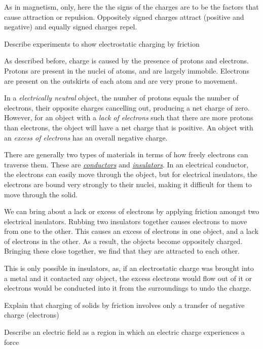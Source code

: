 As in magnetism, only, here the the signs of the charges are to be the factors that cause attraction or
repulsion. Oppositely signed charges attract (positive and negative) and equally signed charges
repel.

\begin{subpoint}
Describe experiments to show electrostatic charging by friction
\end{subpoint}

As described before, charge is caused by the presence of protons and electrons. Protons are 
present in the nuclei of atoms, and are largely immobile. Electrons are present on the outskirts
of each atom and are very prone to movement.

In a \emph{electrically neutral} object, the number of protons equals the number of electrons,
their opposite charges cancelling out, producing a net charge of zero. However, for an object
with a \emph{lack of electrons} such that there are more protons than electrons, the object will
have a net charge that is positive. An object with an \emph{excess of electrons} has an overall
negative charge.

There are generally two types of materials in terms of how freely electrons can traverse them.
These are \ul{\emph{conductors}} and \ul{\emph{insulators}}. In an electrical conductor, the 
electrons can easily move through the object, but for electrical insulators, the electrons are
bound very strongly to their nuclei, making it difficult for them to move through the solid.

\smallskip
We can bring about a lack or excess of electrons by applying friction amongst two electrical
insulators. Rubbing two insulators together causes electrons to move from one to the other. This
causes an excess of electrons in one object, and a lack of electrons in the other. As a result,
the objects become oppositely charged. Bringing these close together, we find that they are 
attracted to each other.

This is only possible in insulators, as, if an electrostatic charge was brought into a metal and
it contacted any object, the excess electrons would flow out of it or electrons would be conducted
into it from the surroundings to undo the charge.

\begin{subpoint}
Explain that charging of solids by friction involves only a transfer of negative charge (electrons)
\end{subpoint}

\begin{subpoint}
Describe an electric field as a region in which an electric charge experiences a force
\end{subpoint}

